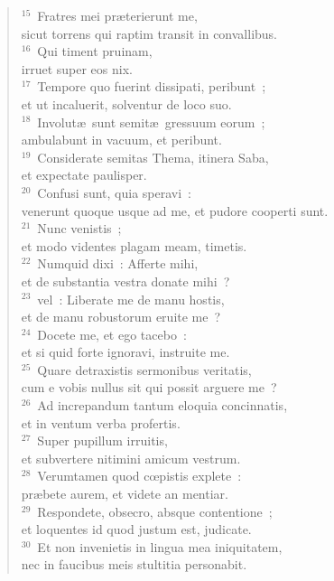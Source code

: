 \begin{flushleft}
\begin{verse}
${}^{15}$~Fratres mei pr\ae terierunt me,\\ sicut torrens qui raptim transit in convallibus.\\
${}^{16}$~Qui timent pruinam,\\ irruet super eos nix.\\
${}^{17}$~Tempore quo fuerint dissipati, peribunt~;\\ et ut incaluerit, solventur de loco suo.\\
${}^{18}$~Involut\ae\ sunt semit\ae\ gressuum eorum~;\\ ambulabunt in vacuum, et peribunt.\\
${}^{19}$~Considerate semitas Thema, itinera Saba,\\ et expectate paulisper.\\
${}^{20}$~Confusi sunt, quia speravi~:\\ venerunt quoque usque ad me, et pudore cooperti sunt.\\
${}^{21}$~Nunc venistis~;\\ et modo videntes plagam meam, timetis.\\
${}^{22}$~Numquid dixi~: Afferte mihi,\\ et de substantia vestra donate mihi~?\\
${}^{23}$~vel~: Liberate me de manu hostis,\\ et de manu robustorum eruite me~?\\
${}^{24}$~Docete me, et ego tacebo~:\\ et si quid forte ignoravi, instruite me.\\
${}^{25}$~Quare detraxistis sermonibus veritatis,\\ cum e vobis nullus sit qui possit arguere me~?\\
${}^{26}$~Ad increpandum tantum eloquia concinnatis,\\ et in ventum verba profertis.\\
${}^{27}$~Super pupillum irruitis,\\ et subvertere nitimini amicum vestrum.\\
${}^{28}$~Verumtamen quod cœpistis explete~:\\ pr\ae bete aurem, et videte an mentiar.\\
${}^{29}$~Respondete, obsecro, absque contentione~;\\ et loquentes id quod justum est, judicate.\\
${}^{30}$~Et non invenietis in lingua mea iniquitatem,\\ nec in faucibus meis stultitia personabit.\end{verse}\end{flushleft}


